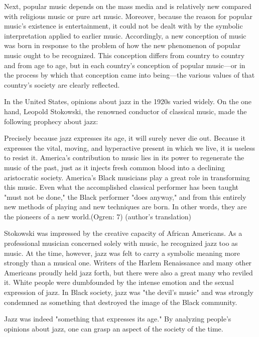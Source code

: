 Next, popular music depends on the mass media and is relatively new compared with religious music or pure art music. Moreover, because the reason for popular music's existence is entertainment, it could not be dealt with by the symbolic interpretation applied to earlier music. Accordingly, a new conception of music was born in response to the problem of how the new phenomenon of popular music ought to be recognized. This conception differs from country to country and from age to age, but in each country's conception of popular music—or in the process by which that conception came into being—the various values of that country's society are clearly reflected.

In the United States, opinions about jazz in the 1920s varied widely. On the one hand, Leopold Stokowski, the renowned conductor of classical music, made the following prophecy about jazz:

\begin{gquote}
Precisely because jazz expresses its age, it will surely never die out. Because it expresses the vital, moving, and hyperactive present in which we live, it is useless to resist it. America's contribution to music lies in its power to regenerate the music of the past, just as it injects fresh common blood into a declining aristocratic society. America's Black musicians play a great role in transforming this music. Even what the accomplished classical performer has been taught "must not be done," the Black performer "does anyway," and from this entirely new methods of playing and new techniques are born. In other words, they are the pioneers of a new world.(Ogren: 7) (author's translation)
\end{gquote}

Stokowski was impressed by the creative capacity of African Americans. As a professional musician concerned solely with music, he recognized jazz too as music. At the time, however, jazz was felt to carry a symbolic meaning more strongly than a musical one. Writers of the Harlem Renaissance and many other Americans proudly held jazz forth, but there were also a great many who reviled it. White people were dumbfounded by the intense emotion and the sexual expression of jazz. In Black society, jazz was "the devil's music" and was strongly condemned as something that destroyed the image of the Black community.

Jazz was indeed "something that expresses its age." By analyzing people's opinions about jazz, one can grasp an aspect of the society of the time.

